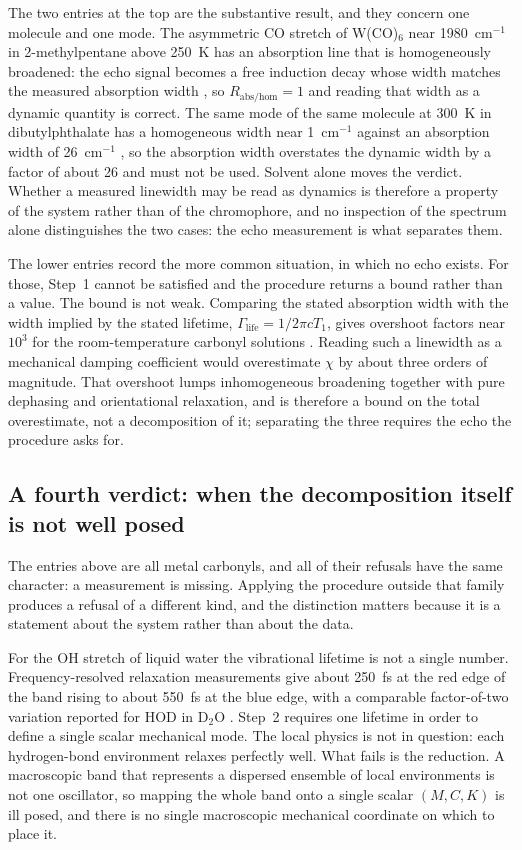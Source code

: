 The two entries at the top are the substantive result, and they concern one
molecule and one mode. The asymmetric CO stretch of W(CO)$_6$ near 1980~cm$^{-1}$
in 2-methylpentane above 250~K has an absorption line that is homogeneously
broadened: the echo signal becomes a free induction decay whose width matches
the measured absorption width \citep{tokmakoff1995}, so \(R_{\mathrm{abs/hom}} = 1\)
and reading that width as a dynamic quantity is correct. The same mode of the
same molecule at 300~K in dibutylphthalate has a homogeneous width near
1~cm$^{-1}$ against an absorption width of 26~cm$^{-1}$ \citep{tokmakoff1995}, so
the absorption width overstates the dynamic width by a factor of about 26 and
must not be used. Solvent alone moves the verdict. Whether a measured linewidth
may be read as dynamics is therefore a property of the system rather than of the
chromophore, and no inspection of the spectrum alone distinguishes the two
cases: the echo measurement is what separates them.

The lower entries record the more common situation, in which no echo exists.
For those, Step~1 cannot be satisfied and the procedure returns a bound rather
than a value. The bound is not weak. Comparing the stated absorption width with
the width implied by the stated lifetime, \(\Gamma_{\mathrm{life}} = 1/2\pi c T_1\),
gives overshoot factors near \(10^3\) for the room-temperature carbonyl solutions
\citep{tokmakoff1994}. Reading such a linewidth as a mechanical damping
coefficient would overestimate \(\chi\) by about three orders of magnitude. That
overshoot lumps inhomogeneous broadening together with pure dephasing and
orientational relaxation, and is therefore a bound on the total overestimate,
not a decomposition of it; separating the three requires the echo the procedure
asks for.

\subsection*{A fourth verdict: when the decomposition itself is not well posed}

The entries above are all metal carbonyls, and all of their refusals have the
same character: a measurement is missing. Applying the procedure outside that
family produces a refusal of a different kind, and the distinction matters
because it is a statement about the system rather than about the data.

For the OH stretch of liquid water the vibrational lifetime is not a single
number. Frequency-resolved relaxation measurements give about 250~fs at the red
edge of the band rising to about 550~fs at the blue edge, with a comparable
factor-of-two variation reported for HOD in D$_2$O \citep{water2015}. Step~2 requires one lifetime in order to define a single
scalar mechanical mode. The local physics is not in question: each hydrogen-bond
environment relaxes perfectly well. What fails is the reduction. A macroscopic
band that represents a dispersed ensemble of local environments is not one
oscillator, so mapping the whole band onto a single scalar \((M, C, K)\) is
ill posed, and there is no single macroscopic mechanical coordinate on which to
place it. 

